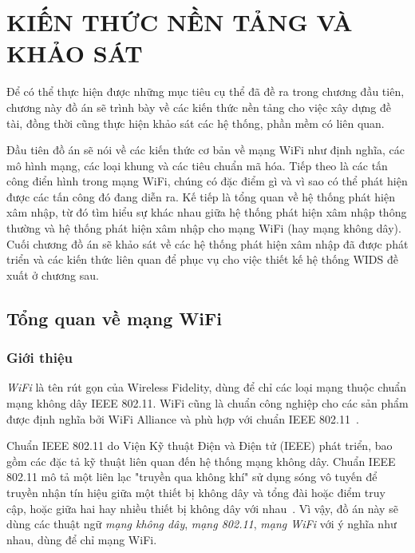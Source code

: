 \chapter{KIẾN THỨC NỀN TẢNG VÀ KHẢO SÁT}
\ifpdf
    \graphicspath{{Chapter2/Chapter2Figs/PNG/}{Chapter2/Chapter2Figs/PDF/}{Chapter2/Chapter2Figs/}}
\else
    \graphicspath{{Chapter2/Chapter2Figs/EPS/}{Chapter2/Chapter2Figs/}}
\fi

Để có thể thực hiện được những mục tiêu cụ thể đã đề ra trong chương đầu tiên, chương này đồ án sẽ trình bày về các kiến thức nền tảng cho việc xây dựng đề tài, đồng thời cũng thực hiện khảo sát các hệ thống, phần mềm có liên quan.

Đầu tiên đồ án sẽ nói về các kiến thức cơ bản về mạng WiFi như định nghĩa, các mô hình mạng, các loại khung và các tiêu chuẩn mã hóa. Tiếp theo là các tấn công điển hình trong mạng WiFi, chúng có đặc điểm gì và vì sao có thể phát hiện được các tấn công đó đang diễn ra. Kế tiếp là tổng quan về hệ thống phát hiện xâm nhập, từ đó tìm hiểu sự khác nhau giữa hệ thống phát hiện xâm nhập thông thường và hệ thống phát hiện xâm nhập cho mạng WiFi (hay mạng không dây). Cuối chương đồ án sẽ khảo sát về các hệ thống phát hiện xâm nhập đã được phát triển và các kiến thức liên quan để phục vụ cho việc thiết kế hệ thống WIDS đề xuất ở chương sau.

\section{Tổng quan về mạng WiFi}

\subsection{Giới thiệu}
\emph{WiFi} là tên rút gọn của Wireless Fidelity, dùng để chỉ các loại mạng thuộc chuẩn mạng không dây IEEE 802.11. WiFi cũng là chuẩn công nghiệp cho các sản phẩm được định nghĩa bởi WiFi Alliance và phù hợp với chuẩn IEEE 802.11~\cite{varma2006wireless}.

Chuẩn IEEE 802.11 do Viện Kỹ thuật Điện và Điện tử (IEEE) phát triển, bao gồm các đặc tả kỹ thuật liên quan đến hệ thống mạng không dây. Chuẩn IEEE 802.11 mô tả một liên lạc "truyền qua không khí" sử dụng sóng vô tuyến để truyền nhận tín hiệu giữa một thiết bị không dây và tổng đài hoặc điểm truy cập, hoặc giữa hai hay nhiều thiết bị không dây với nhau~\cite{ieee2012802}. Vì vậy, đồ án này sẽ dùng các thuật ngữ \emph{mạng không dây}, \emph{mạng 802.11}, \emph{mạng WiFi} với ý nghĩa như nhau, dùng để chỉ mạng WiFi.

